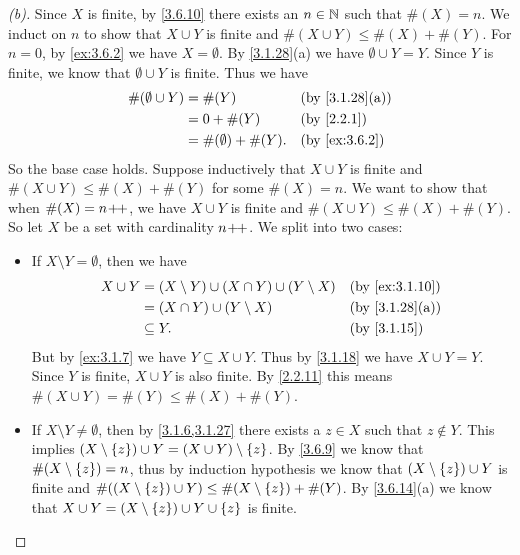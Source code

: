 \begin{proof}[(b)]
	Since \(X\) is finite, by \cref{3.6.10} there exists an \(n \in \mathbb{N}\) such that \(\#(X) = n\).
	We induct on \(n\) to show that \(X \cup Y\) is finite and \(\#(X \cup Y) \leq \#(X) + \#(Y)\).
	For \(n = 0\), by \cref{ex:3.6.2} we have \(X = \emptyset\).
	By \cref{3.1.28}(a) we have \(\emptyset \cup Y = Y\).
	Since \(Y\) is finite, we know that \(\emptyset \cup Y\) is finite.
	Thus we have
	\begin{align*}
		\#(\emptyset \cup Y) & = \#(Y)                  &  & \by{3.1.28}[a] \\
		                     & = 0 + \#(Y)              &  & \by{2.2.1}     \\
		                     & = \#(\emptyset) + \#(Y). &  & \by{ex:3.6.2}
	\end{align*}
	So the base case holds.
	Suppose inductively that \(X \cup Y\) is finite and \(\#(X \cup Y) \leq \#(X) + \#(Y)\) for some \(\#(X) = n\).
	We want to show that when \(\#(X) = n\!+\!\!+\), we have \(X \cup Y\) is finite and \(\#(X \cup Y) \leq \#(X) + \#(Y)\).
	So let \(X\) be a set with cardinality \(n\!+\!\!+\).
	We split into two cases:
	\begin{itemize}
		\item If \(X \setminus Y = \emptyset\), then we have
		      \begin{align*}
			      X \cup Y & = (X \setminus Y) \cup (X \cap Y) \cup (Y \setminus X) &  & \by{ex:3.1.10} \\
			               & = (X \cap Y) \cup (Y \setminus X)                      &  & \by{3.1.28}[a] \\
			               & \subseteq Y.                                           &  & \by{3.1.15}
		      \end{align*}
		      But by \cref{ex:3.1.7} we have \(Y \subseteq X \cup Y\).
		      Thus by \cref{3.1.18} we have \(X \cup Y = Y\).
		      Since \(Y\) is finite, \(X \cup Y\) is also finite.
		      By \cref{2.2.11} this means \(\#(X \cup Y) = \#(Y) \leq \#(X) + \#(Y)\).
		\item If \(X \setminus Y \neq \emptyset\), then by \cref{3.1.6,3.1.27} there exists a \(z \in X\) such that \(z \notin Y\).
		      This implies \((X \setminus \left\lbrace z\right\rbrace) \cup Y = (X \cup Y) \setminus \left\lbrace z\right\rbrace\).
		      By \cref{3.6.9} we know that \(\#(X \setminus \left\lbrace z\right\rbrace) = n\), thus by induction hypothesis we know that \((X \setminus \left\lbrace z\right\rbrace) \cup Y\) is finite and \(\#((X \setminus \left\lbrace z\right\rbrace) \cup Y) \leq \#(X \setminus \left\lbrace z\right\rbrace) + \#(Y)\).
		      By \cref{3.6.14}(a) we know that \(X \cup Y = (X \setminus \left\lbrace z\right\rbrace) \cup Y \cup \left\lbrace z\right\rbrace\) is finite.

\end{itemize}
\end{proof}
